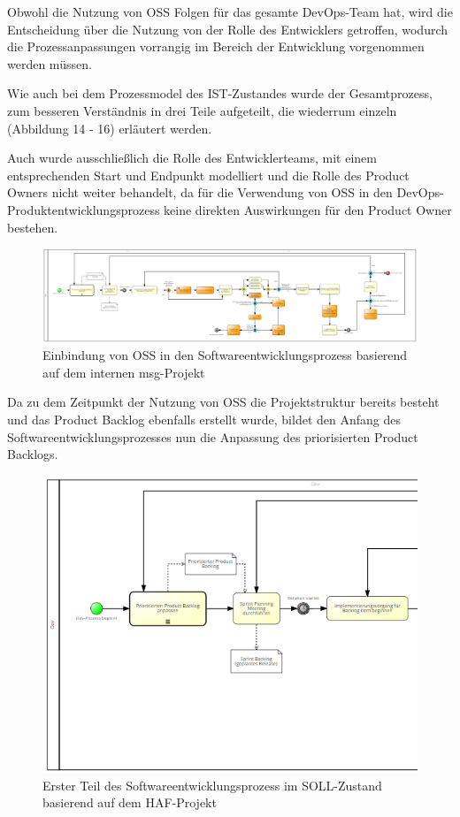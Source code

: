 Obwohl die Nutzung von OSS Folgen für das gesamte DevOps-Team hat, wird die Entscheidung über die Nutzung von der Rolle des Entwicklers getroffen, wodurch die Prozessanpassungen vorrangig im Bereich der Entwicklung vorgenommen werden müssen. 

Wie auch bei dem Prozessmodel des IST-Zustandes wurde der Gesamtprozess, zum besseren Verständnis in drei Teile aufgeteilt, die wiederrum einzeln (Abbildung 14 - 16) erläutert werden. 

Auch wurde ausschließlich die Rolle des Entwicklerteams, mit einem entsprechenden Start und Endpunkt modelliert und die Rolle des Product Owners nicht weiter behandelt, da für die Verwendung von OSS in den DevOps-Produktentwicklungsprozess keine direkten Auswirkungen für den Product Owner bestehen.

\begin{figure}[p]
    \centering
    \includegraphics[angle=90, scale=0.5]{Bilder/SOLL-Prozess.png}
    \caption{Einbindung von OSS in den Softwareentwicklungsprozess basierend auf dem internen msg-Projekt}
\end{figure}

Da zu dem Zeitpunkt der Nutzung von OSS die Projektstruktur bereits besteht und das Product Backlog ebenfalls erstellt wurde, bildet den Anfang des Softwareentwicklungsprozesses nun die Anpassung des priorisierten Product Backlogs.

\begin{figure}[h]
    \centering
    \includegraphics[scale=0.5]{Bilder/SOLL-Prozess_first Part.png}
    \caption{Erster Teil des Softwareentwicklungsprozess im SOLL-Zustand basierend auf dem HAF-Projekt}
\end{figure}

